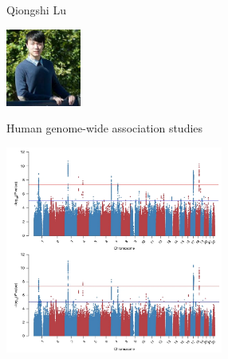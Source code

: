 \documentclass[12pt,t,aspectratio=169]{beamer}
\begin{document}
\begin{frame}{Qiongshi Lu}

\hspace*{0.85\textwidth}
\includegraphics[height=1in]{Pics/qiongshi_lu.jpg}
\vspace*{-30mm}

{\large Human genome-wide association studies}

\bigskip

\includegraphics[height=68mm]{Pics/qiongshi_lu_gwas.png}


\end{frame}
\end{document}
